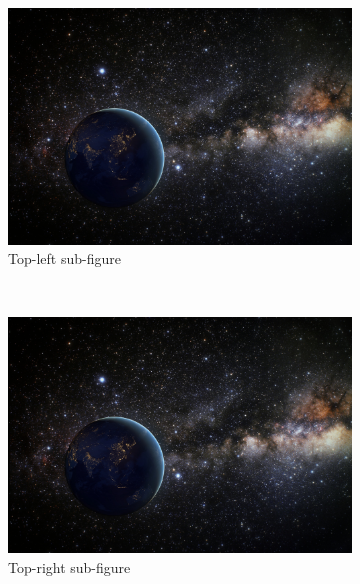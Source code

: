 \begin{figure}[H]
    \centering
    \begin{subfigure}{.45\textwidth}
        \centering
        \includegraphics[width=\linewidth]{figures/samples/earth-in-space.jpg}
        \caption{Top-left sub-figure}
        \label{fig:sub-top-left}
    \end{subfigure}
    ~
    \begin{subfigure}{.45\textwidth}
        \centering
        \includegraphics[width=\linewidth]{figures/samples/earth-in-space.jpg}
        \caption{Top-right sub-figure}
        \label{fig:sub-top-rigth}
    \end{subfigure}
    \hfill
    \begin{subfigure}{.45\textwidth}
        \centering

\end{subfigure}
\end{figure}
